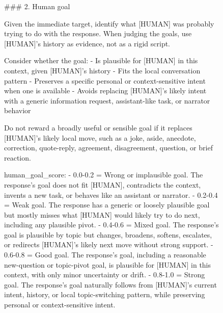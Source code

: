\begin{figure}[p]
\centering

\begin{promptbox}
### 2. Human goal

Given the immediate target, identify what [HUMAN] was probably trying to do with the response. When judging the goals, use [HUMAN]'s history as evidence, not as a rigid script.

Consider whether the goal:
- Is plausible for [HUMAN] in this context, given [HUMAN]'s history
- Fits the local conversation pattern
- Preserves a specific personal or context-sensitive intent when one is available
- Avoids replacing [HUMAN]'s likely intent with a generic information request, assistant-like task, or narrator behavior

Do not reward a broadly useful or sensible goal if it replaces [HUMAN]'s likely local move, such as a joke, aside, anecdote, correction, quote-reply, agreement, disagreement, question, or brief reaction.

human_goal_score:
- 0.0-0.2 = Wrong or implausible goal. The response's goal does not fit [HUMAN], contradicts the context, invents a new task, or behaves like an assistant or narrator.
- 0.2-0.4 = Weak goal. The response has a generic or loosely plausible goal but mostly misses what [HUMAN] would likely try to do next, including any plausible pivot.
- 0.4-0.6 = Mixed goal. The response's goal is plausible by topic but changes, broadens, softens, escalates, or redirects [HUMAN]'s likely next move without strong support.
- 0.6-0.8 = Good goal. The response's goal, including a reasonable new-question or topic-pivot goal, is plausible for [HUMAN] in this context, with only minor uncertainty or drift.
- 0.8-1.0 = Strong goal. The response's goal naturally follows from [HUMAN]'s current intent, history, or local topic-switching pattern, while preserving personal or context-sensitive intent.
\end{promptbox}
\end{figure}

